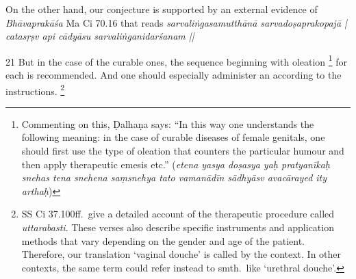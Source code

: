 On the other hand, our conjecture is supported by an external evidence of 
\textit{Bhāvaprakāśa} Ma Ci 70.16 that reads \textit{sarvaliṅgasamutthānā 
sarvadoṣaprakopajā | catasṛṣv api cādyāsu sarvaliṅganidarśanam ||} 


\begin{translation}
\item [21]
But in the case of the curable ones, the sequence beginning with oleation%
\footnote{%
Commenting on this, Ḍalhaṇa says: “In this way one understands the following 
meaning: in the case of curable diseases of female genitals, one should first use 
the type of oleation that counters the particular humour and then apply 
therapeutic emesis etc.”
(\textit{etena yasya doṣasya yaḥ pratyanīkaḥ snehas tena snehena saṃsnehya 
tato vamanādīn sādhyāsv avacārayed ity arthaḥ})
} 
for each  is recommended.
And one should especially administer an  
according to the instructions.%
\footnote{%
SS Ci 37.100ff.\ give a detailed account of the therapeutic procedure called 
\textit{uttarabasti}. These verses also describe specific instruments and 
application methods that vary depending on the gender and age of the patient. 
Therefore, our translation ‘vaginal douche’ is called by the context. In other 
contexts, the same term could refer instead to smth.\ like ‘urethral douche’.
}


\end{translation}
